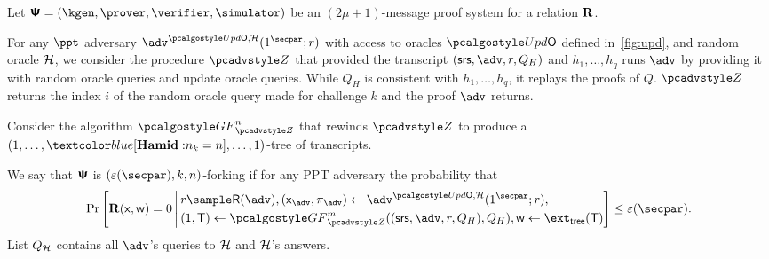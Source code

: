 \begin{definition}
	Let $\proofsystem = (\kgen, \prover, \verifier, \simulator)$ be an
	$(2 \mu + 1)$-message proof system for a relation $\mathbf{R}$.
	
	For any $\ppt$ adversary $\advse^{\initU,
		\ro} (1^\secpar; r)$ with access to oracles $\initU$ defined in~\cref{fig:upd}, and random oracle $\mathcal{H}$, we consider the procedure $\zdv$ that provided the transcript $(\srs, \adv, r, Q_H)$ and $h_1, \ldots, h_q$ runs $\adv$ by providing it with random oracle queries
	and update oracle queries. While $Q_{H}$ is consistent with $h_1, \ldots, h_q$, it replays the proofs of $Q$.
	$\zdv$ returns the index $i$ of the
	random oracle query made for challenge $k$ and the proof $\adv$ returns.
	
	Consider the algorithm $\genforking_{\zdv}^{n}$
	that rewinds $\zdv$ to produce a $(1,\dots, \hamid{n_k=n},\dots, 1)$-tree of
	transcripts.
	
	We say that $\bm{\mathsf{\Psi}}$ is $(\eps(\secpar), k,n)$-forking if
	for any PPT adversary the probability that
	\begin{align*}
	\Pr\left[
	\REL(\inp, \wit) = 0
	\,\Biggl|\,
	\begin{aligned}
	& r \sample \RND{\advse},
	(\inp_{\advse}, \zkproof_{\advse}) \gets \advse^{\initU, \ro} (1^\secpar; r), \\
	&    (1, \tree) \gets \genforking_{\zdv}^{m}((\srs,\adv,r, Q_{H}),Q_{H}),
	\wit \gets \extt(\tree)
	\end{aligned}
	\right] \leq \eps(\secpar).
	\end{align*}
	List $Q_{\mathcal{H}}$ contains all $\advse$'s
	queries to $\mathcal{H}$ and $\mathcal{H}$'s answers. 
\end{definition}

